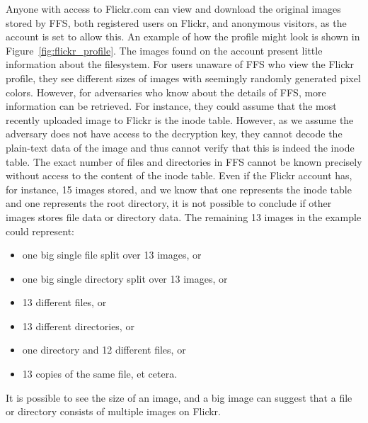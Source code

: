 Anyone with access to Flickr.com can view and download the original images stored by \gls{FFS}, both registered users on Flickr, and anonymous visitors, as the account is set to allow this. An example of how the profile might look is shown in Figure~\ref{fig:flickr_profile}. The images found on the account present little information about the filesystem. For users unaware of \gls{FFS} who view the Flickr profile, they see different sizes of images with seemingly randomly generated pixel colors. However, for adversaries who know about the details of \gls{FFS}, more information can be retrieved. For instance, they could assume that the most recently uploaded image to Flickr is the inode table. However, as we assume the adversary does not have access to the decryption key, they cannot decode the \mbox{plain-text} data of the image and thus cannot verify that this is indeed the inode table. The exact number of files and directories in \gls{FFS} cannot be known precisely without access to the content of the inode table. Even if the Flickr account has, for instance, 15 images stored, and we know that one represents the inode table and one represents the root directory, it is not possible to conclude if other images stores file data or directory data. The remaining 13 images in the example could represent:
\begin{itemize}
	\item one big single file split over 13 images, or
	\item one big single directory split over 13 images, or
	\item 13 different files, or
	\item 13 different directories, or
	\item one directory and 12 different files, or
	\item 13 copies of the same file, et cetera.
\end{itemize}
It is possible to see the size of an image, and a big image can suggest that a file or directory consists of multiple images on Flickr.

